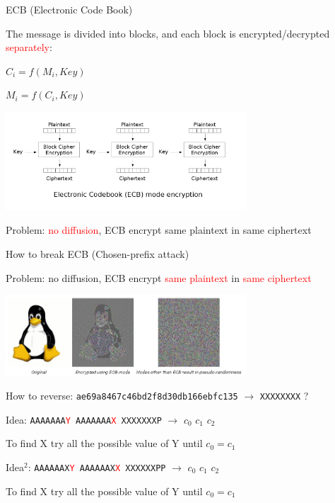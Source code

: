 \begin{frame}{ECB (Electronic Code Book)}

The message is divided into blocks, and each block is encrypted/decrypted \textcolor{red}{separately}:

\medskip

\centerline{$C_i = f(M_i, Key)$}

\centerline{$M_i = f(C_i, Key)$}

\medskip

\centerline{\includegraphics[width=9cm]{img/ECB.png}}

\medskip

Problem: \textcolor{red}{no diffusion}, ECB encrypt same plaintext in same ciphertext

\end{frame}

\begin{frame}{How to break ECB (Chosen-prefix attack)}

  Problem: no diffusion, ECB encrypt \textcolor{red}{same plaintext} in \textcolor{red}{same ciphertext}
  
  \medskip
  
  \centerline{\includegraphics[width=9cm]{img/tux.jpg}}

  \medskip
  
  How to reverse: \texttt{ae69a8467c46bd2f8d30db166ebfc135} $\rightarrow$ \texttt{XXXXXXXX} ?  

  \medskip

  \phantom{pad}Idea: \texttt{AAAAAAA\textcolor{red}{Y} AAAAAAA\textcolor{red}{X} XXXXXXXP} $\rightarrow$ $c_0$ $c_1$ $c_2$
  
  \medskip
  
  To find X try all the possible value of Y until $c_0 = c_1$

  \medskip

  \phantom{pad}Idea$^2$: \texttt{AAAAAAX\textcolor{red}{Y} AAAAAAX\textcolor{red}{X} XXXXXXPP} $\rightarrow$ $c_0$ $c_1$ $c_2$
    
  \medskip
  
  To find X try all the possible value of Y until $c_0 = c_1$
  
\end{frame}

